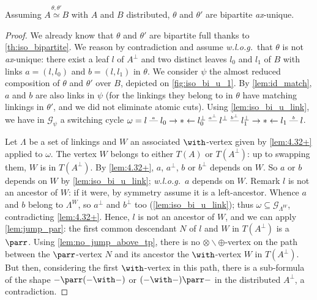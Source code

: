 \documentclass{lmcs}
\newcommand*{\orth}{^\perp} %
\newcommand*{\tens}{\otimes} %
\newcommand*{\tp}{\tens\backslash\oplus} %
\newcommand*{\wolog}{\emph{w.l.o.g.}}
\newcommand*{\G}{\mathcal{G}}
\newcommand*{\iso}{\mathrel{\simeq}} %
\newcommand{\symboltext}[2]{\mathrel{\overset{\makebox[0pt]{\mbox{\normalfont\tiny\sffamily \ensuremath{#1}}}}{#2}}} %
\newcommand{\cadratin}{\mathrel{\text{\textemdash}}} %
\newcommand{\edgelab}[1]{\symboltext{#1}{\cadratin}} %
\newcommand{\isoproofs}[4]{\overset{\ensuremath{#3,#4}}{#1\iso #2}}
\newcommand*{\unique}{\textit{ax}-unique}
\begin{document}
\begin{thm}
\label{th:iso_bipartite_unique}
Assuming $\isoproofs{A}{B}{\theta}{\theta'}$ with $A$ and $B$ distributed, $\theta$ and $\theta'$ are bipartite \unique.
\end{thm}
\begin{proof}
We already know that $\theta$ and $\theta'$ are bipartite full thanks to \autoref{th:iso_bipartite}.
We reason by contradiction and assume \wolog\ that $\theta$ is not \unique: there exist a leaf $l$ of $A\orth$ and two distinct leaves $l_0$ and $l_1$ of $B$ with links $a=(l,l_0)$ and $b=(l,l_1)$ in $\theta$.
We consider $\psi$ the almost reduced composition of $\theta$ and $\theta'$ over $B$, depicted on \autoref{fig:iso_bi_u_1}.
By \autoref{lem:id_match}, $a$ and $b$ are also links in $\psi$ (for the linkings they belong to in $\theta$ have matching linkings in $\theta'$, and we did not eliminate atomic cuts).
Using \autoref{lem:iso_bi_u_link}, we have in $\G_\psi$ a switching cycle $\omega=l\edgelab{a} l_0\rightarrow\ast\leftarrow l_0\orth\edgelab{a\orth} l\orth\edgelab{b\orth} l_1\orth\rightarrow\ast\leftarrow l_1\edgelab{b} l$.

Let $\Lambda$ be a set of linkings and $W$ an associated $\with$-vertex given by \autoref{lem:4.32+} applied to $\omega$.
The vertex $W$ belongs to either $T(A)$ or $T(A\orth)$: up to swapping them, $W$ is in $T(A\orth)$.
By \autoref{lem:4.32+}, $a$, $a\orth$, $b$ or $b\orth$ depends on $W$.
So $a$ or $b$ depends on $W$ by \autoref{lem:iso_bi_u_link}; \wolog\ $a$ depends on $W$.
Remark $l$ is not an ancestor of $W$: if it were, by symmetry assume it is a left-ancestor.
Whence $a$ and $b$ belong to $\Lambda^W$, so $a\orth$ and $b\orth$ too (\autoref{lem:iso_bi_u_link}); thus $\omega\subseteq\G_{\Lambda^W}$, contradicting \autoref{lem:4.32+}.
Hence, $l$ is not an ancestor of $W$, and we can apply \autoref{lem:jump_par}: the first common descendant $N$ of $l$ and $W$ in $T(A\orth)$ is a $\parr$.
Using \autoref{lem:no_jump_above_tp}, there is no $\tp$-vertex on the path between the $\parr$-vertex $N$ and its ancestor the $\with$-vertex $W$ in $T(A\orth)$.
But then, considering the first $\with$-vertex in this path, there is a sub-formula of the shape $-\parr(-\with-)$ or $(-\with-)\parr-$ in the distributed $A\orth$, a contradiction.
\end{proof}
\end{document}
